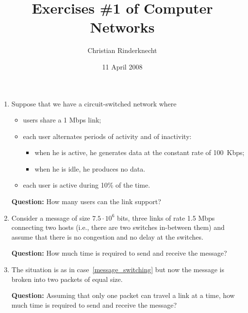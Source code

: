 \documentclass[11pt,a4paper]{article}
\title{Exercises \#1 of Computer Networks}
\author{Christian Rinderknecht}
\date{11 April 2008}
\begin{document}
\maketitle

\thispagestyle{empty}

\begin{enumerate}

  \item Suppose that we have a circuit-switched network where
    \begin{itemize}

      \item users share a 1 Mbps link;

      \item each user alternates periods of activity and of inactivity:
        \begin{itemize}

          \item when he is active, he generates data at the constant
            rate of 100~Kbps;

          \item when he is idle, he produces no data.

        \end{itemize}

      \item each user is active during 10\% of the time.

    \end{itemize}
    \textbf{Question:} How many users can the link support?

  \item \label{message_switching} Consider a message of size \(7.5
    \cdot 10^6\) bits, three links of rate 1.5 Mbps connecting two
    hosts (i.e., there are two switches in-between them) and assume
    that there is no congestion and no delay at the switches.

    \textbf{Question:} How much time is required to send and receive
    the message?

  \item The situation is as in case~\ref{message_switching} but now
    the message is broken into two packets of equal size. 

    \textbf{Question:} Assuming that only one packet can travel a link
    at a time, how much time is required to send and receive the
    message?


\end{enumerate}
\end{document}
